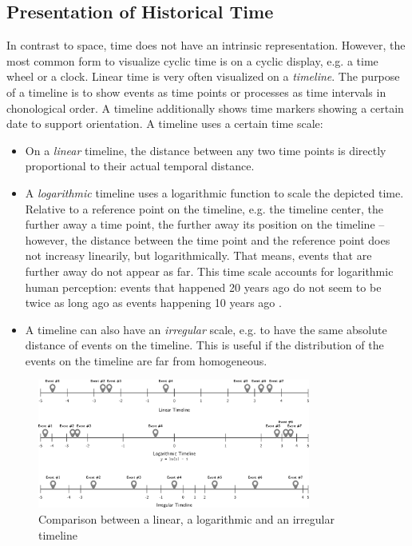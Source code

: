 

\subsection{Presentation of Historical Time} %
\label{sub:presentation_of_historical_time}

In contrast to space, time does not have an intrinsic representation. However, the most common form to visualize cyclic time is on a cyclic display, e.g. a time wheel or a clock. Linear time is very often visualized on a \emph{timeline}. The purpose of a timeline is to show events as time points or processes as time intervals in chonological order. A timeline additionally shows time markers showing a certain date to support orientation. A timeline uses a certain time scale:

\begin{itemize}
  \item On a \emph{linear} timeline, the distance between any two time points is directly proportional to their actual temporal distance.
  \item A \emph{logarithmic} timeline uses a logarithmic function to scale the depicted time. Relative to a reference point on the timeline, e.g. the timeline center, the further away a time point, the further away its position on the timeline -- however, the distance between the time point and the reference point does not increasy linearily, but logarithmically. That means, events that are further away do not appear as far. This time scale accounts for logarithmic human perception: events that happened 20 years ago do not seem to be twice as long ago as events happening 10 years ago
  \cite{logorlinear}.
  \item A timeline can also have an \emph{irregular} scale, e.g. to have the same absolute distance of events on the timeline. This is useful if the distribution of the events on the timeline are far from homogeneous.
\end{itemize}

\begin{figure}[ht]
  \centering
  \includegraphics[width=0.8\textwidth]{graphics/basics/timelines/timelines}
  \caption{Comparison between a linear, a logarithmic and an irregular timeline}
  \label{fig:timelines}
\end{figure}

